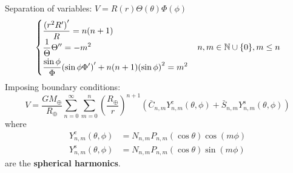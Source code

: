 \documentclass{beamer} %
\begin{document}
\begin{frame}
  Separation of variables: $V=R(r)\Theta(\theta)\Phi(\phi)$
  \begin{gather*}
    \begin{cases}
      \displaystyle\frac{{(r^2R')}'}{R}=n(n+1)                   \\
      \displaystyle\frac{1}{\Theta}\Theta''  =-m^2\vspace{0.1cm} \\
      \displaystyle\frac{\sin\phi}{\Phi}{(\sin\phi\Phi')}'+n(n+1){(\sin\phi)}^2  =m^2
    \end{cases}\!n,m\in\NN\cup\{0\}, m\leq n
  \end{gather*}
  Imposing boundary conditions:
  \begin{equation*}
    V =\frac{GM_\oplus}{R_\oplus}\sum_{n=0}^\infty \sum_{m=0}^n{\left(\frac{{R_\oplus}}{r}\right)}^{n+1}(\bar{C}_{n,m}Y_{n,m}^{\mathrm{c}}(\theta,\phi)+\bar{S}_{n,m}Y_{n,m}^{\mathrm{s}}(\theta,\phi))
  \end{equation*}
  where
  \begin{align*}
    Y_{n,m}^{\mathrm{c}}(\theta,\phi) & =N_{n,m}P_{n,m}(\cos\theta)\cos(m\phi) \\
    Y_{n,m}^{\mathrm{s}}(\theta,\phi) & =N_{n,m}P_{n,m}(\cos\theta)\sin(m\phi)
  \end{align*}
  are the \textbf{spherical harmonics}.
\end{frame}
\end{document}
